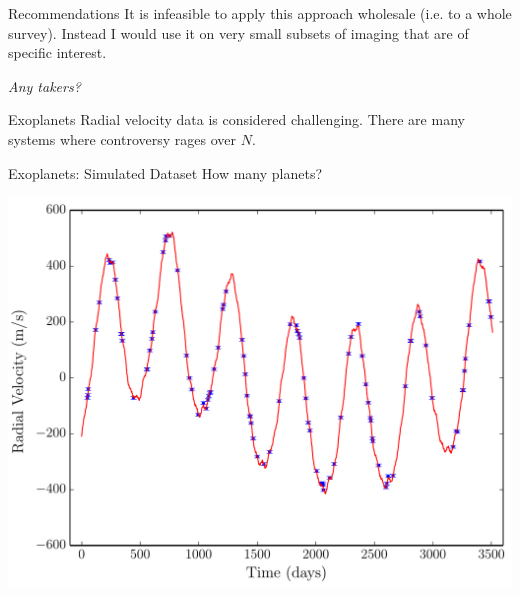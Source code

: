 \begin{frame}[t]{Recommendations}
It is infeasible to apply this approach wholesale (i.e. to a whole survey).
Instead I would use it on very small subsets of imaging that are of specific
interest.

\vspace{20pt}

\begin{center}
{\it Any takers?}
\end{center}
\end{frame}



\begin{frame}[t]{Exoplanets}
Radial velocity data is considered challenging. There are many systems where
controversy rages over $N$.
\end{frame}

\begin{frame}[t]{Exoplanets: Simulated Dataset}
How many planets?
\begin{center}
\includegraphics[scale=0.35]{ExoplanetFigures/fake_data.pdf}
\end{center}
\end{frame}

